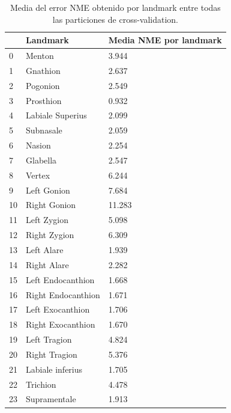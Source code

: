         \begin{table}[!ht]
            \centering
            \caption{Media del error NME obtenido por landmark entre todas las particiones de cross-validation.}
            \begin{tabular}{|l|l|l|}
            \hline
                ~ & \cellcolor{gray!25}\textbf{Landmark} & \cellcolor{gray!25}\textbf{Media NME por landmark} \\ \hline
                0 & Menton & 3.944 \\ \hline
                1 & Gnathion & 2.637 \\ \hline
                2 & Pogonion & 2.549 \\ \hline
                3 & Prosthion & 0.932 \\ \hline
                4 & Labiale Superius & 2.099 \\ \hline
                5 & Subnasale & 2.059 \\ \hline
                6 & Nasion & 2.254 \\ \hline
                7 & Glabella & 2.547 \\ \hline
                8 & Vertex & 6.244 \\ \hline
                9 & Left Gonion & 7.684 \\ \hline
                10 & Right Gonion & 11.283 \\ \hline
                11 & Left Zygion & 5.098 \\ \hline
                12 & Right Zygion & 6.309 \\ \hline
                13 & Left Alare & 1.939 \\ \hline
                14 & Right Alare & 2.282 \\ \hline
                15 & Left Endocanthion & 1.668 \\ \hline
                16 & Right Endocanthion & 1.671 \\ \hline
                17 & Left Exocanthion & 1.706 \\ \hline
                18 & Right Exocanthion & 1.670 \\ \hline
                19 & Left Tragion & 4.824 \\ \hline
                20 & Right Tragion & 5.376 \\ \hline
                21 & Labiale inferius & 1.705 \\ \hline
                22 & Trichion & 4.478 \\ \hline
                23 & Supramentale & 1.913 \\ \hline

\end{tabular}
\end{table}
